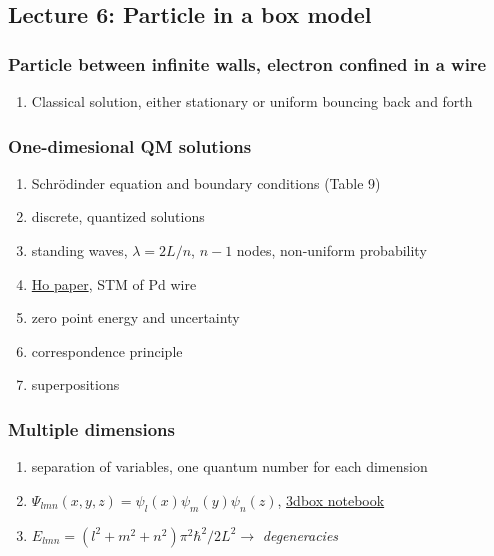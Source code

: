 \documentclass[11pt]{article}
\begin{document}
\subsection{Lecture 6: Particle in a box model}
\label{sec:orgc486aa0}
\subsubsection{Particle between infinite walls, electron confined in a wire}
\label{sec:org6b71813}
\begin{enumerate}
\item Classical solution, either stationary or uniform bouncing back and forth
\end{enumerate}
\subsubsection{One-dimesional QM solutions}
\label{sec:orgba1d72f}
\begin{enumerate}
\item Schr\"{o}dinder equation and boundary conditions (Table 9)
\item discrete, quantized solutions
\item standing waves, \(\lambda=2 L/n\), \(n-1\) nodes, non-uniform probability
\item \href{http://dx.doi.org/10.1021/jp053496l}{Ho paper}, STM of Pd wire
\item zero point energy and uncertainty
\item correspondence principle
\item superpositions
\end{enumerate}
\subsubsection{Multiple dimensions}
\label{sec:org1220fa1}
\begin{enumerate}
\item separation of variables, one quantum number for each dimension
\item \(\Psi_{lmn}(x,y,z) = \psi_l(x) \psi_m(y) \psi_n(z)\), \href{https://colab.research.google.com/github/wmfschneider/CHE30324/blob/master/Resources/3dbox.ipynb}{3dbox notebook}
\item \(E_{lmn}=(l^2+m^2+n^2)\pi^2\hbar^2/2L^2 \longrightarrow\) \emph{degeneracies}
\end{enumerate}
\end{document}
